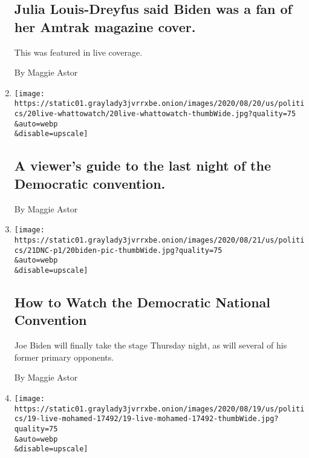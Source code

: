 \begin{enumerate}
  \hypertarget{julia-louis-dreyfus-said-biden-was-a-fan-of-her-amtrak-magazine-cover}{%
  \subsection{Julia Louis-Dreyfus said Biden was a fan of her Amtrak
  magazine
  cover.}\label{julia-louis-dreyfus-said-biden-was-a-fan-of-her-amtrak-magazine-cover}}

  This was featured in live coverage.

  By Maggie Astor
\item
  \href{/2020/08/20/us/elections/a-viewers-guide-to-the-last-night-of-the-democratic-convention.html}{}

  \texttt{[image: https://static01.graylady3jvrrxbe.onion/images/2020/08/20/us/politics/20live-whattowatch/20live-whattowatch-thumbWide.jpg?quality=75\\\&auto=webp\\\&disable=upscale]}

  \hypertarget{a-viewers-guide-to-the-last-night-of-the-democratic-convention}{%
  \subsection{A viewer's guide to the last night of the Democratic
  convention.}\label{a-viewers-guide-to-the-last-night-of-the-democratic-convention}}

  By Maggie Astor
\item
  \href{/2020/08/20/us/politics/dnc.html}{}

  \texttt{[image: https://static01.graylady3jvrrxbe.onion/images/2020/08/21/us/politics/21DNC-p1/20biden-pic-thumbWide.jpg?quality=75\\\&auto=webp\\\&disable=upscale]}

  \hypertarget{how-to-watch-the-democratic-national-convention}{%
  \subsection{How to Watch the Democratic National
  Convention}\label{how-to-watch-the-democratic-national-convention}}

  Joe Biden will finally take the stage Thursday night, as will several
  of his former primary opponents.

  By Maggie Astor
\item
  \href{/live/2020/08/19/us/dnc-convention-election/advocates-for-domestic-violence-survivors-praised-biden-in-a-video}{}

  \texttt{[image: https://static01.graylady3jvrrxbe.onion/images/2020/08/19/us/politics/19-live-mohamed-17492/19-live-mohamed-17492-thumbWide.jpg?quality=75\\\&auto=webp\\\&disable=upscale]}


\end{enumerate}
